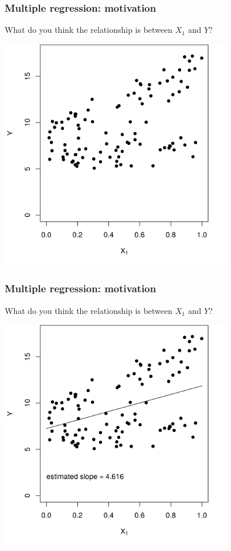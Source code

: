 \documentclass[12pt, 
hyperref={colorlinks=true, linkcolor=blue, urlcolor=cyan},dvipsnames]{beamer}
\begin{document}
\begin{frame}
\frametitle{Multiple regression: motivation}
What do you think the relationship is between $X_1$ and $Y$?

\centering
\includegraphics[width = 0.75\textwidth]{plots/effect_modification_simple.png}
\end{frame}

\begin{frame}
\frametitle{Multiple regression: motivation}
What do you think the relationship is between $X_1$ and $Y$?

\centering
\includegraphics[width = 0.75\textwidth]{plots/effect_modification_simple_with_line.png}
\end{frame}
\end{document}
